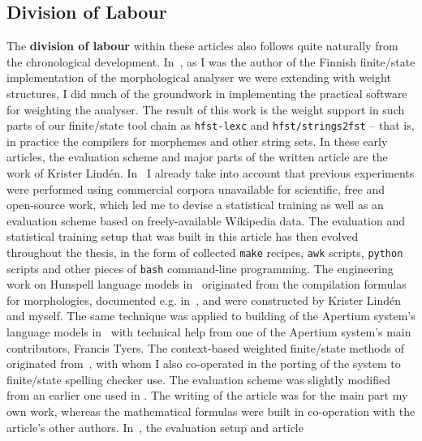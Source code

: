 \documentclass[officiallayout,final]{unihelcompling}
\begin{document}
\subsection{Division of Labour}
\label{subsec:division-of-labour}

The \textbf{division of labour} within these articles also follows quite
naturally from the chronological development.
In~, as I was the author
of the Finnish finite\-/state implementation of the morphological analyser we
were extending with weight structures, I did much of the groundwork in
implementing the practical software for weighting the analyser. The result of
this work is the weight support in such parts of our finite\-/state tool chain
as \texttt{hfst-lexc} and \texttt{hfst\-/strings2fst} -- that is, in practice
the compilers for morphemes and other string sets. In these early articles, the
evaluation scheme and major parts of the written article are the work of
Krister Lindén.  In~ I already take into
account that previous experiments were performed using commercial corpora
unavailable for scientific, free and open-source work, which led me to devise a
statistical training as well as an evaluation scheme based on freely-available
Wikipedia data. The evaluation and statistical training setup that was built in
this article has then evolved throughout the thesis, in the form of collected
\texttt{make} recipes, \texttt{awk} scripts, \texttt{python} scripts and other
pieces of \texttt{bash} command-line programming. The engineering work on
Hunspell language models
in~ originated from the
compilation formulas for morphologies, documented e.g.\/
in~\cite{linden2009hfst}, and were constructed by Krister Lindén and myself.
The same technique was applied to building of the Apertium system's language
models in~ with technical help from one of the
Apertium system's main contributors, Francis Tyers.  The context-based weighted
finite\-/state methods of  originated
from~\citet{silfverberg2010partofspeech}, with whom I also co-operated in the
porting of the system to finite\-/state spelling checker use. The evaluation
scheme was slightly modified from an earlier one used in
. The writing of the article
 was for the main part  my own work, whereas
the mathematical formulas were built in co-operation with the article's other
authors.  In~, the evaluation setup and article
\end{document}
